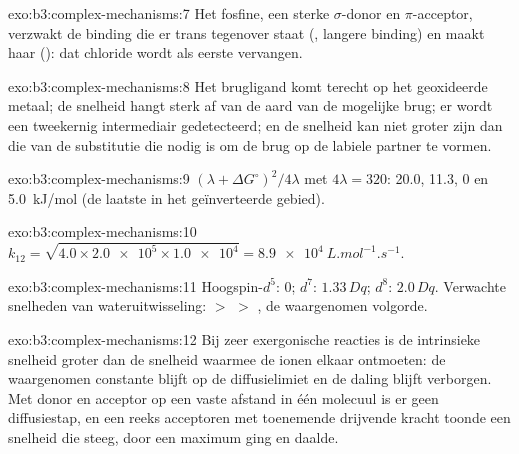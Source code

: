 \begin{solution}{exo:b3:complex-mechanisms:7}
Het fosfine, een sterke $\sigma$-donor en $\pi$-acceptor, verzwakt de binding die er trans tegenover staat (,
langere binding) en maakt haar  (): dat chloride wordt
als eerste vervangen.
\end{solution}

\begin{solution}{exo:b3:complex-mechanisms:8}
Het brugligand komt terecht op het geoxideerde metaal; de snelheid hangt
sterk af van de aard van de mogelijke brug; er wordt een tweekernig
intermediair gedetecteerd; en de snelheid kan niet groter zijn dan die
van de substitutie die nodig is om de brug op de labiele partner te
vormen.
\end{solution}

\begin{solution}{exo:b3:complex-mechanisms:9}
$(\lambda + \Delta G^\circ)^2/4\lambda$ met $4\lambda = 320$: 20.0, 11.3, 0 en \qty{5.0}{kJ/mol} (de laatste in het
geïnverteerde gebied).
\end{solution}

\begin{solution}{exo:b3:complex-mechanisms:10}
$k_{12} = \sqrt{4.0 \times \num{2.0e5} \times \num{1.0e4}} = \qty{8.9e4}{L.mol^{-1}.s^{-1}}$.
\end{solution}

\begin{solution}{exo:b3:complex-mechanisms:11}
Hoogspin-$d^5$: 0; $d^7$: $1.33\,Dq$; $d^8$: $2.0\,Dq$. Verwachte snelheden van wateruitwisseling:  $>$  $>$
, de waargenomen volgorde.
\end{solution}

\begin{solution}{exo:b3:complex-mechanisms:12}
Bij zeer exergonische reacties is de intrinsieke snelheid groter dan de
snelheid waarmee de ionen elkaar ontmoeten: de waargenomen constante
blijft op de diffusielimiet en de daling blijft verborgen. Met donor en
acceptor op een vaste afstand in één molecuul is er geen diffusiestap,
en een reeks acceptoren met toenemende drijvende kracht toonde een
snelheid die steeg, door een maximum ging en daalde.
\end{solution}

